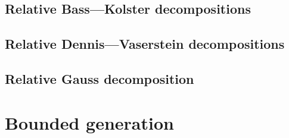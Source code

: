 \documentclass[12pt]{amsart}
\numberwithin{equation}{section}
\theoremstyle{definition}
\begin{document}
\subsection{Relative Bass---Kolster decompositions}\label{sec:bass-kolster}

\subsection{Relative Dennis---Vaserstein decompositions}\label{sec:dennis-vaserstein}

\subsection{Relative Gauss decomposition}\label{sec:gauss}


\section{Bounded generation}\label{sec:boundgen}

%

\printbibliography
\end{document}
